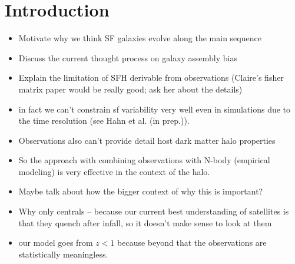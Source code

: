 \documentclass[12pt, letterpaper, preprint]{aastex}
\newcommand{\bitem}{\begin{itemize}}
\newcommand{\eitem}{\end{itemize}}
\newcommand{\hahngmm}{Hahn et al. (in prep.)}
\begin{document}
\section{Introduction}
\bitem 
\item Motivate why we think SF galaxies evolve along the main sequence  
\item Discuss the current thought process on galaxy assembly bias 
\item Explain the limitation of SFH derivable from observations (Claire's fisher matrix paper would be really good; ask her about the details) 
\item in fact we can't constrain sf variability very well even in simulations due to the time resolution (see \hahngmm).  
\item Observations also can't provide detail host dark matter halo properties
\item So the approach with combining observations with N-body (empirical modeling) is very effective in the context of the halo.
\item Maybe talk about how the bigger context of why this is important?  
\item Why only centrals -- because our current best understanding of satellites is that they quench after infall, so it doesn't make sense to look at them
\item our model goes from $z < 1$ because beyond that the observations are statistically meaningless.  
\eitem 
\end{document}
